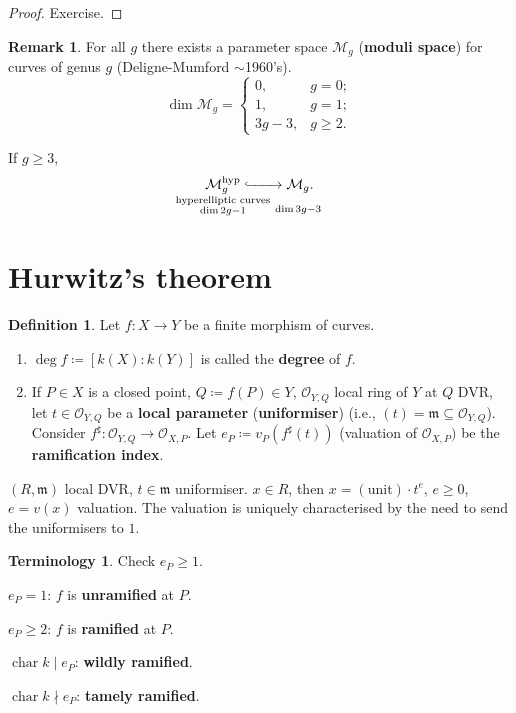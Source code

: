 \documentclass[12pt]{article}
\DeclareMathOperator{\chara}{char}
\theoremstyle{definition}
\newtheorem*{definition}{Definition}
\newtheorem*{remark}{Remark}
\newtheorem*{terminology}{Terminology}
\begin{document}
\begin{proof}
Exercise.
\end{proof}

\begin{remark}
For all $g$ there exists a parameter space $\mathcal{M}_g$ (\textbf{moduli space}) for curves of genus $g$ (Deligne-Mumford $\sim$1960's).
\[\dim\mathcal{M}_g=\left\{\begin{array}{ll}0,&g=0;\\1,&g=1;\\3g-3,&g\geq2.\end{array}\right.\]

If $g\geq3$,
\[{\vphantom{\mathcal{M}_g^{\text{hyp}}}}\underset{\mathclap{\substack{\text{hyperelliptic curves}\\\dim2g-1}}}{\mathcal{M}_g^{\text{hyp}}}\lhook\joinrel\xrightarrow{\hspace{7mm}}\underset{\mathclap{\substack{\vphantom{hyplt}\\\dim3g-3}}}{\mathcal{M}_g}.\]
\end{remark}

\section{Hurwitz's theorem}
\begin{definition}
Let $f:X\rightarrow Y$ be a finite morphism of curves.

\begin{enumerate}[label=\arabic*)]
\item $\deg f\coloneqq[k(X):k(Y)]$ is called the \textbf{degree} of $f$.

\item If $P\in X$ is a closed point, $Q\coloneqq f(P)\in Y$, $\mathcal{O}_{Y,Q}$ local ring of $Y$ at $Q$ DVR, let $t\in\mathcal{O}_{Y,Q}$ be a \textbf{local parameter} (\textbf{uniformiser}) (i.e., $(t)=\mathfrak{m}\subseteq\mathcal{O}_{Y,Q}$). Consider $f^{\sharp}:\mathcal{O}_{Y,Q}\rightarrow\mathcal{O}_{X,P}$. Let $e_P\coloneqq v_P(f^{\sharp}(t))$ (valuation of $\mathcal{O}_{X,P})$ be the \textbf{ramification index}.
\end{enumerate}
\end{definition}

$(R,\mathfrak{m})$ local DVR, $t\in \mathfrak{m}$ uniformiser. $x\in R$, then $x=(\text{unit})\cdot t^e$, $e\geq0$, $e=v(x)$ valuation. The valuation is uniquely characterised by the need to send the uniformisers to $1$.

\begin{terminology}
Check $e_P\geq1$.

$e_P=1$: $f$ is \textbf{unramified} at $P$.

$e_P\geq2$: $f$ is \textbf{ramified} at $P$.

$\chara k\mid e_P$: \textbf{wildly ramified}.

$\chara k\nmid e_P$: \textbf{tamely ramified}.
\end{terminology}
\end{document}
